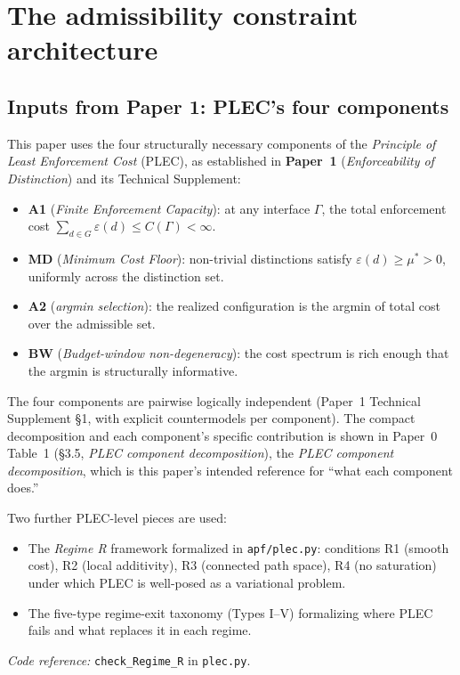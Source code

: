 \documentclass[11pt]{article}
\newcommand{\coderef}[2]{\smallskip\noindent\textit{Code reference:} \texttt{#1} in \texttt{#2}.}
\newcommand{\PLEC}{\emph{Principle of Least Enforcement Cost}}
\newcommand{\Aone}{\textbf{A1}}
\newcommand{\Atwo}{\textbf{A2}}
\newcommand{\MD}{\textbf{MD}}
\newcommand{\BW}{\textbf{BW}}
\newcommand{\paperref}[2]{\textbf{Paper~#1} (\textit{#2})}
\theoremstyle{definition}
\begin{document}
\section{The admissibility constraint architecture}\label{sec:inputs}

\subsection{Inputs from Paper 1: PLEC's four components}\label{sec:inputs_plec}

This paper uses the four structurally necessary components of the \PLEC{} (PLEC), as established in \paperref{1}{Enforceability of Distinction} and its Technical Supplement:

\begin{itemize}
    \item \Aone{} (\emph{Finite Enforcement Capacity}): at any interface $\Gamma$, the total enforcement cost $\sum_{d \in G} \varepsilon(d) \leq C(\Gamma) < \infty$.
    \item \MD{} (\emph{Minimum Cost Floor}): non-trivial distinctions satisfy $\varepsilon(d) \geq \mu^* > 0$, uniformly across the distinction set.
    \item \Atwo{} (\emph{argmin selection}): the realized configuration is the argmin of total cost over the admissible set.
    \item \BW{} (\emph{Budget-window non-degeneracy}): the cost spectrum is rich enough that the argmin is structurally informative.
\end{itemize}

The four components are pairwise logically independent (Paper~1 Technical Supplement \S1, with explicit countermodels per component). The compact decomposition and each component's specific contribution is shown in Paper~0 Table~1 (\S3.5, \emph{PLEC component decomposition}), the \emph{PLEC component decomposition}, which is this paper's intended reference for ``what each component does.''

Two further PLEC-level pieces are used:

\begin{itemize}
    \item The \emph{Regime R} framework formalized in \texttt{apf/plec.py}: conditions R1 (smooth cost), R2 (local additivity), R3 (connected path space), R4 (no saturation) under which PLEC is well-posed as a variational problem.
    \item The five-type regime-exit taxonomy (Types I--V) formalizing where PLEC fails and what replaces it in each regime.
\end{itemize}
\coderef{check\_Regime\_R}{plec.py}
\end{document}
